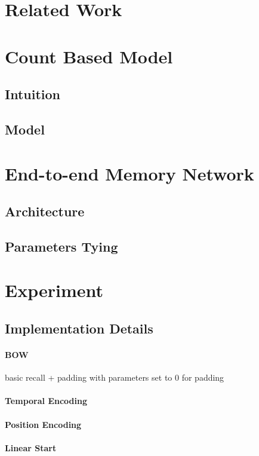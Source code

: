 \documentclass[twoside,11pt]{article}
\begin{document}
\section{Related Work}

\section{Count Based Model}
\subsection{Intuition}
\subsection{Model}

\section{End-to-end Memory Network}
\subsection{Architecture}
\subsection{Parameters Tying}

\section{Experiment}
\subsection{Implementation Details}
\paragraph{BOW}
basic recall + padding with parameters set to 0 for padding

\paragraph{Temporal Encoding}
\paragraph{Position Encoding}
\paragraph{Linear Start}
\end{document}
